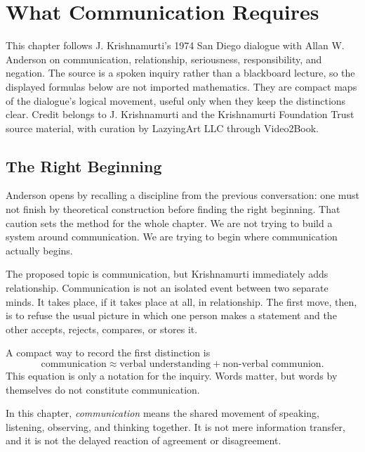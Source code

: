 \chapter{What Communication Requires}

This chapter follows J. Krishnamurti's 1974 San Diego dialogue with Allan W. Anderson on communication, relationship, seriousness, responsibility, and negation. The source is a spoken inquiry rather than a blackboard lecture, so the displayed formulas below are not imported mathematics. They are compact maps of the dialogue's logical movement, useful only when they keep the distinctions clear. Credit belongs to J. Krishnamurti and the Krishnamurti Foundation Trust source material, with curation by LazyingArt LLC through Video2Book.

\section{The Right Beginning}

Anderson opens by recalling a discipline from the previous conversation: one must not finish by theoretical construction before finding the right beginning. That caution sets the method for the whole chapter. We are not trying to build a system around communication. We are trying to begin where communication actually begins.

The proposed topic is communication, but Krishnamurti immediately adds relationship. Communication is not an isolated event between two separate minds. It takes place, if it takes place at all, in relationship. The first move, then, is to refuse the usual picture in which one person makes a statement and the other accepts, rejects, compares, or stores it.

A compact way to record the first distinction is
\begin{equation}
\text{communication}
\approx
\text{verbal understanding}
+
\text{non-verbal communion}.
\end{equation}
This equation is only a notation for the inquiry. Words matter, but words by themselves do not constitute communication.

\begin{definition}
In this chapter, \emph{communication} means the shared movement of speaking, listening, observing, and thinking together. It is not mere information transfer, and it is not the delayed reaction of agreement or disagreement.
\end{definition}

